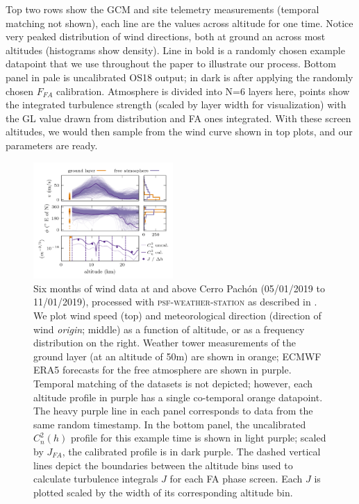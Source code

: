 \documentclass[twocolumn]{aastex631}
\newcommand{\psfws}{\textsc{psf-weather-station}\xspace}
\newcommand{\osborn}{OS18\xspace}
\begin{document}
Top two rows show the GCM and site telemetry measurements (temporal matching not shown), each line are the values across altitude for one time.
Notice very peaked distribution of wind directions, both at ground an across most altitudes (histograms show density).
Line in bold is a randomly chosen example datapoint that we use throughout the paper to illustrate our process.
Bottom panel in pale is uncalibrated \osborn output; in dark is after applying the randomly chosen $F_{FA}$ calibration.
Atmosphere is divided into N=6 layers here, points show the integrated turbulence strength (scaled by layer width for visualization) with the GL value drawn from distribution and FA ones integrated.
With these screen altitudes, we would then sample from the wind curve shown in top plots, and our parameters are ready.

\begin{figure}
\includegraphics[width=0.475\textwidth]{inputs.png}
\caption{
    Six months of wind data at and above Cerro Pach\'on (05/01/2019 to 11/01/2019), processed with \psfws as described in .
    We plot wind speed (top) and meteorological direction (direction of wind \textsl{origin}; middle) as a function of altitude, or as a frequency distribution on the right. 
    Weather tower measurements of the ground layer (at an altitude of 50\unit{m}) are shown in orange; ECMWF ERA5 forecasts for the free atmosphere are shown in purple.
    Temporal matching of the datasets is not depicted; however, each altitude profile in purple has a single co-temporal orange datapoint.
    The heavy purple line in each panel corresponds to data from the same random timestamp.
    In the bottom panel, the uncalibrated $C_n^2(h)$ profile for this example time is shown in light purple; scaled by $J_{FA}$, the calibrated profile is in dark purple. 
    The dashed vertical lines depict the boundaries between the altitude bins used to calculate turbulence integrals $J$ for each FA phase screen.
    Each $J$ is plotted scaled by the width of its corresponding altitude bin.
    \label{fig:inputs}
    }
\end{figure}
\end{document}
